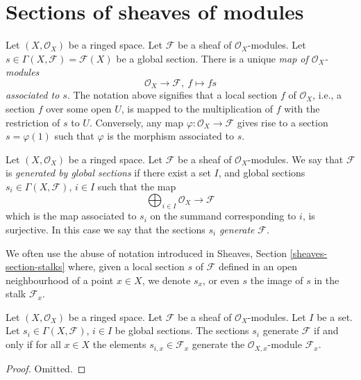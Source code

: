 \section{Sections of sheaves of modules}
\label{section-sections}

\noindent
Let $(X, \mathcal{O}_X)$ be a ringed space.
Let $\mathcal{F}$ be a sheaf of $\mathcal{O}_X$-modules.
Let $s \in \Gamma(X, \mathcal{F}) = \mathcal{F}(X)$ be a
global section. There is a unique {\it map of $\mathcal{O}_X$-modules}
$$
\mathcal{O}_X \longrightarrow \mathcal{F}, \ f \longmapsto fs
$$
{\it associated to $s$}. The notation above signifies that a local
section $f$ of $\mathcal{O}_X$, i.e., a section $f$ over some open $U$,
is mapped to the multiplication of $f$ with the restriction of $s$ to
$U$. Conversely, any map $\varphi : \mathcal{O}_X \to \mathcal{F}$
gives rise to a section $s = \varphi(1)$ such that $\varphi$ is
the morphism associated to $s$.

\begin{definition}
\label{definition-globally-generated}
Let $(X, \mathcal{O}_X)$ be a ringed space.
Let $\mathcal{F}$ be a sheaf of $\mathcal{O}_X$-modules.
We say that $\mathcal{F}$ is {\it generated by global
sections} if there exist a set $I$, and
global sections $s_i \in \Gamma(X, \mathcal{F})$, $i \in I$
such that the map
$$
\bigoplus\nolimits_{i \in I}
\mathcal{O}_X \longrightarrow \mathcal{F}
$$
which is the map associated to $s_i$ on the summand corresponding to $i$,
is surjective. In this case we say that the sections $s_i$
{\it generate} $\mathcal{F}$.
\end{definition}

\noindent
We often use the abuse of notation introduced in
Sheaves, Section \ref{sheaves-section-stalks} where, given a local
section $s$ of $\mathcal{F}$ defined in an open neighbourhood
of a point $x \in X$, we denote $s_x$, or even $s$ the image of $s$
in the stalk $\mathcal{F}_x$.

\begin{lemma}
\label{lemma-globally-generated}
Let $(X, \mathcal{O}_X)$ be a ringed space.
Let $\mathcal{F}$ be a sheaf of $\mathcal{O}_X$-modules.
Let $I$ be a set. Let
$s_i \in \Gamma(X, \mathcal{F})$, $i \in I$
be global sections. The sections $s_i$ generate
$\mathcal{F}$ if and only if for all $x\in X$ the
elements $s_{i, x} \in \mathcal{F}_x$ generate
the $\mathcal{O}_{X, x}$-module $\mathcal{F}_x$.
\end{lemma}

\begin{proof}
Omitted.
\end{proof}

